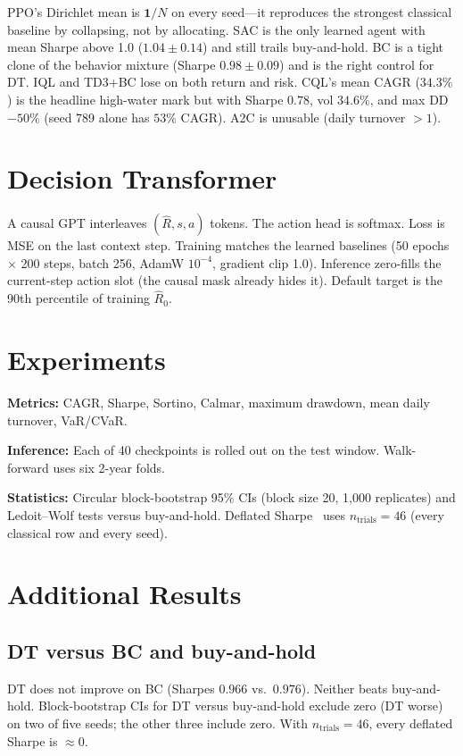 \documentclass[11pt]{article}
\begin{document}
PPO's Dirichlet mean is $\mathbf{1}/N$ on every seed---it reproduces the strongest classical baseline by collapsing, not by allocating. SAC is the only learned agent with mean Sharpe above 1.0 ($1.04\pm0.14$) and still trails buy-and-hold. BC is a tight clone of the behavior mixture (Sharpe $0.98\pm0.09$) and is the right control for DT. IQL and TD3+BC lose on both return and risk. CQL's mean CAGR ($34.3\%$) is the headline high-water mark but with Sharpe $0.78$, vol $34.6\%$, and max DD $-50\%$ (seed 789 alone has $53\%$ CAGR). A2C is unusable (daily turnover $>1$).

\section{Decision Transformer}
A causal GPT interleaves $(\hat{R},s,a)$ tokens. The action head is softmax. Loss is MSE on the last context step. Training matches the learned baselines (50 epochs $\times$ 200 steps, batch 256, AdamW $10^{-4}$, gradient clip 1.0). Inference zero-fills the current-step action slot (the causal mask already hides it). Default target is the 90th percentile of training $\hat{R}_0$.

\section{Experiments}
\textbf{Metrics:} CAGR, Sharpe, Sortino, Calmar, maximum drawdown, mean daily turnover, VaR/CVaR.

\textbf{Inference:} Each of 40 checkpoints is rolled out on the test window. Walk-forward uses six 2-year folds.

\textbf{Statistics:} Circular block-bootstrap 95\% CIs (block size 20, 1{,}000 replicates) and Ledoit--Wolf tests versus buy-and-hold. Deflated Sharpe~\cite{bailey2014dsr} uses $n_{\mathrm{trials}}=46$ (every classical row and every seed).

\section{Additional Results}

\subsection{DT versus BC and buy-and-hold}
DT does not improve on BC (Sharpes $0.966$ vs.\ $0.976$). Neither beats buy-and-hold. Block-bootstrap CIs for DT versus buy-and-hold exclude zero (DT worse) on two of five seeds; the other three include zero. With $n_{\mathrm{trials}}=46$, every deflated Sharpe is $\approx 0$.
\end{document}
